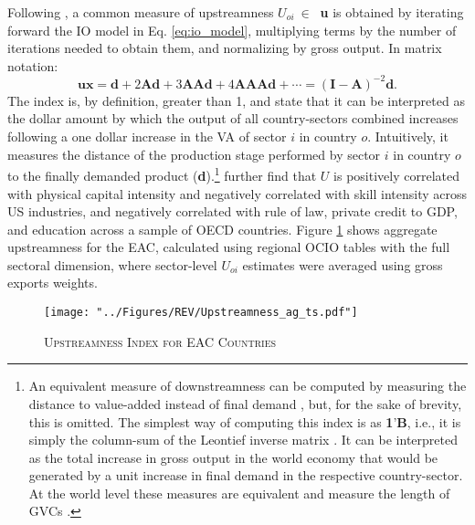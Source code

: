 \documentclass[a4paper]{article}
\begin{document}
Following \citet{antras2012measuring, antras2022global}, a common measure of upstreamness $U_{oi} \ \in \ $ \textbf{u} is obtained by iterating forward the IO model in Eq. \ref{eq:io_model}, multiplying terms by the number of iterations needed to obtain them, and normalizing by gross output. In matrix notation: 
\begin{equation} \label{eq:upstreamness}
\textbf{u}\textbf{x} = \textbf{d} + 2\textbf{Ad} + 3\textbf{AAd} + 4\textbf{AAAd} + \cdots = (\textbf{I}-\textbf{A})^{-2}\textbf{d}.
\end{equation}
The index is, by definition, greater than 1, and \citet{antras2012measuring} state that it can be interpreted as the dollar amount by which the output of all country-sectors combined increases following a one dollar increase in the VA of sector $i$ in country $o$. Intuitively, it measures the distance of the production stage performed by sector $i$ in country $o$ to the finally demanded product (\textbf{d}).\footnote{An equivalent measure of downstreamness can be computed by measuring the distance to value-added instead of final demand \citep{antras2022global, miller2017output, mancini2023positioning}, but, for the sake of brevity, this is omitted. The simplest way of computing this index is as \textbf{1}'\textbf{B}, i.e., it is simply the column-sum of the Leontief inverse matrix \citep{miller2017output, antras2022global}. It can be interpreted as the total increase in gross output in the world economy that would be generated by a unit increase in final demand in the respective country-sector. 
At the world level these measures are equivalent and measure the length of GVCs \citep{mancini2023positioning}.} \citet{antras2012measuring} further find that $U$ is positively correlated with physical capital intensity and negatively correlated with skill intensity across US industries, and negatively correlated with rule of law, private credit to GDP, and education across a sample of OECD countries. Figure \ref{fig:EACUS_ag_ts} shows aggregate upstreamness for the EAC, calculated using regional OCIO tables with the full sectoral dimension, where sector-level $U_{oi}$ estimates were averaged using gross exports weights. \newline

\begin{figure}[h!]
\centering
\caption{\label{fig:EACUS_ag_ts}\textsc{Upstreamness Index for EAC Countries}}
\texttt{[image: "../Figures/REV/Upstreamness\_ag\_ts.pdf"]} %
\end{figure}
\FloatBarrier
\end{document}
